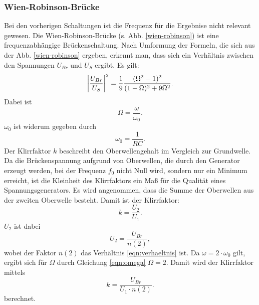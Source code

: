 \subsubsection{Wien-Robinson-Brücke}
Bei den vorherigen Schaltungen ist die Frequenz für die Ergebnise nicht relevant gewesen. %
\newline
Die Wien-Robinson-Brücke (s. Abb. \ref{wien-robinson}) ist eine frequenzabhängige Brückenschaltung.
Nach Umformung der Formeln, die sich aus der Abb. \ref{wien-robinson} ergeben, erkennt man, dass
sich ein Verhältnis zwischen den Spannungen $U_{Br}$ und $U_S$ ergibt. 
Es gilt:
\begin{equation}
\abs{\frac{U_{Br}}{U_S}}^2 = \frac{1}{9} \frac{(\Omega^2 -1)^2}{(1- \Omega)^2 + 9 \Omega^2}.
    \label{eqn:verhaeltnis}
\end{equation}
Dabei ist
\begin{equation}
    \Omega = \frac{\omega}{\omega_0}.
    \label{eqn:omega}
\end{equation}
$\omega_0$ ist widerum gegeben durch
\begin{equation}
    \omega_0 = \frac{1}{RC}.
    \label{omega0}
\end{equation}
\newline
Der Klirrfaktor $k$ beschreibt den Oberwellengehalt im Vergleich zur
Grundwelle. Da die Brückenspannung aufgrund von Oberwellen, die durch
den Generator erzeugt werden, bei der Frequenz $f_0$ nicht Null wird,
sondern nur ein Minimum erreicht, ist die Kleinheit des Klirrfaktors
ein Maß für die Qualität eines Spannungsgenerators.
\newline
Es wird angenommen, dass die Summe der Oberwellen aus der zweiten
Oberwelle besteht. Damit ist der Klirrfaktor:
\begin{equation*}
    k = \frac{U_2}{U_1}.
\end{equation*}
$U_2$ ist dabei
\begin{equation*}
    U_2 = \frac{U_{Br}}{n(2)},
\end{equation*}
wobei der Faktor $n(2)$ das Verhältnis \eqref{eqn:verhaeltnis} ist. %
Da $\omega = 2 \cdot \omega_0$ gilt, ergibt sich für $\Omega$ durch Gleichung \eqref{eqn:omega}
$\Omega = 2$.
Damit wird der Klirrfaktor mittels
\begin{equation}
    k = \frac{U_{Br}}{U_1 \cdot n(2)}. %
    \label{eqn:k}
\end{equation}
berechnet.

